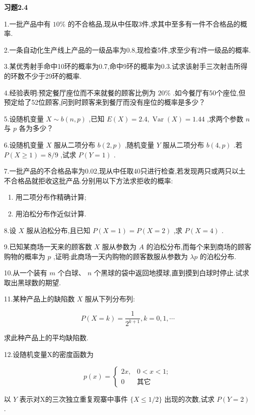\begin{center}
	\textbf{习题2.4}
\end{center}

1.一批产品中有 $ 10\% $ 的不合格品,现从中任取3件,求其中至多有一件不合格品的概率.

2.一条自动化生产线上产品的一级品率为0.8,现检查5件,求至少有2件一级品的概率.

3.某优秀射手命中10环的概率为0.7,命中9环的概率为0.3.试求该射手三次射击所得的环数不少于29环的概率.

4.经验表明:预定餐厅座位而不来就餐的顾客比例为 $ 20\% $ .如今餐厅有50个座位,但预定给了52位顾客,问到时顾客来到餐厅而没有座位的概率是多少？

5.设随机变量 $ X \sim b(n, p) $ ,已知 $ E(X)=2.4, \operatorname{Var}(X)=1.44 $ ,求两个参数 $ n $ 与 $ p $ 各为多少？

6.设随机变量 $ X $ 服从二项分布 $ b(2,p) $ ,随机变量 $ Y $ 服从二项分布 $ b(4,p) $ .若 $ P(X \geqslant 1)=8/9 $ ,试求 $ P(Y=1) $ .

7.一批产品的不合格品率为0.02,现从中任取40只进行检查,若发现两只或两只以土不合格品就拒收这批产品.分别用以下方法求拒收的概率:

\begin{enumerate}
	\item 用二项分布作精确计算;
	\item 用泊松分布作近似计算.
\end{enumerate}

8.设 $ X $ 服从泊松分布,且已知 $ P(X=1)=P(X=2) $ ,求 $ P(X=4) $ .

9.已知某商场一天来的顾客数 $ X $ 服从参数为 $ A $ 的泊松分布,而每个来到商场的顾客购物的概率为 $ p $ ,证明:此商场一天内购物的顾客数服从参数为 $ \lambda p $ 的泊松分布.

10.从一个装有 $ m $ 个白球、 $ n $ 个黑球的袋中返回地摸球,直到摸到白球时停止.试求取出黑球数的期望.

11.某种产品上的缺陷数 $ X $ 服从下列分布列:

\[
P(X=k)=\frac{1}{2^{k+1}}, k=0,1, \cdots
\]

求此种产品上的平均缺陷数.

12.设随机变量X的密度函数为

\[
p(x)=\left\{
\begin{array}{ll}
{2 x,} & {0<x<1 ;} \\ 
{0}    & {\text{其它}}
\end{array}
\right.
\]

以 $ Y $ 表示对X的三次独立重复观寨中事件 $ \{X \leqslant 1 / 2\} $ 出现的次数,试求 $ P(Y=2) $ .

